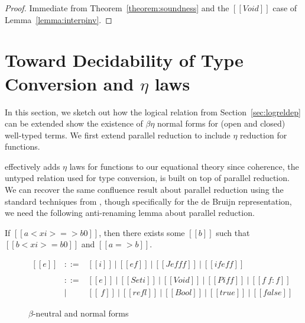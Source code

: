 \documentclass[acmsmall,screen=true,
\ifpublic review=false\else,review=true\fi
  ,anonymous=\ifanonymous true\else false\fi]{acmart}
\newcommand{\scw}[1]{}
\begin{document}
\scw{Spell this out in a little more detail.}

\begin{proof}
  Immediate from Theorem~\ref{theorem:soundness} and the $[[Void]]$ case of Lemma~\ref{lemma:interpinv}.
\end{proof}

\section{Toward Decidability of Type Conversion and $\eta$ laws}
\label{sec:extension}
In this section, we sketch out how the logical relation from
Section~\ref{sec:logreldep} can be extended show the existence of
$\beta\eta$ normal forms for (open and closed) well-typed terms. We
first extend parallel reduction to include $\eta$ reduction for
functions.
\begin{center}
\end{center}

 effectively adds $\eta$ laws for functions to our
equational theory since coherence, the untyped relation used for type
conversion, is built on top of parallel reduction. We can recover the
same confluence result about parallel reduction using the standard
techniques from \citet{barendregt:lambda-calculi-with-types,
takahashi-parallel-reduction}, though specifically for the de Bruijn
representation, we need the following anti-renaming lemma about
parallel reduction.
\begin{lemma}
  \label{lemma:parantirenaming} If $[[a < xi > => b0]]$, then there
exists some $[[b]]$ such that $[[b < xi > = b0]]$ and $[[a => b]]$.
\end{lemma}

\begin{figure}[h]
  \[
    \begin{array}{lcl}
      [[e]] & ::= & [[i]]\ |\ [[e f]]\ |\ [[J e f f f]]\ |\ [[if e f
                    f]] \\ \\
      [[f]] & ::= & [[e]]\ |\ [[Set i]]\ |\ [[Void]]\ |\ [[Pi f f]]\
                    |\ [[f ~ f : f]]\\
            & |   & [[\ f]]\ |\ [[refl]]\ |\ [[Bool]]\ |\ [[true]]\ |\ [[false]]
    \end{array}
  \]
  \caption{$\beta$-neutral and normal forms}
  \label{fig:nenf}
\end{figure}
\end{document}
